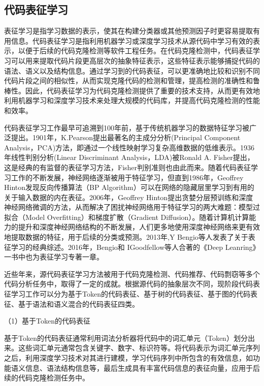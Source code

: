 \subsection{代码表征学习}
表征学习是指学习数据的表示，使其在构建分类器或其他预测因子时更容易提取有用信息\cite{Bengio2013Representation}。代码表征学习是指利用机器学习或深度学习技术从源代码中学习有效的表示，以便于后续的代码克隆检测等软件工程任务。在代码克隆检测中，代码表征学习可以用来提取代码片段更高层次的抽象特征表示，这些特征表示能够捕捉代码的语法、语义以及结构信息。通过学习到的代码表征，可以更准确地比较和识别不同代码片段之间的相似性，从而实现克隆代码的检测和管理，提高检测的准确性和鲁棒性。因此，代码表征学习为代码克隆检测提供了重要的技术支持，从而更有效地利用机器学习和深度学习技术来处理大规模的代码库，并提高代码克隆检测的性能和效率。

代码表征学习工作最早可追溯到100年前，基于传统机器学习的数据特征学习被广泛提出。1901年，K.Pearson提出最著名的主成分分析(Principal Component Analysis，PCA)方法\cite{WOS:000202849800065}，即通过一个线性映射学习复杂高维数据的低维表示。1936年线性判别分析(Linear Discriminant Analysis，LDA)被Ronald A. Fisher提出\cite{2012THE}，这是经典的有监督的表征学习方法，Fisher判别准则也由此而来。随着代码表征学习工作的不断发展，神经网络逐渐被用于特征学习，但直到1986年，Geoffrey Hinton\cite{1986Learning}发现反向传播算法（BP Algorithm）可以在网络的隐藏层里学习到有用的关于输入数据的内在表征。2006年，Geoffrey Hinton提出贪婪分层预训练和深度神经网络微调\cite{2006A}的方法，从而解决了困扰神经网络用于特征学习的两大难题：模型过拟合（Model Overfitting）和梯度扩散（Gradient Diffusion）。随着计算机计算能力的提升和深度神经网络结构的不断发展，人们更多地使用深度神经网络来更有效地提取数据的特征，用于后续的分类或预测。2013年,Y Bengio等人发表了关于表征学习的经典综述\cite{Bengio2013Representation}。2016年，Bengio和 IGoodfellow等人合著的《Deep Leanring》一书中也为表征学习专著一章\cite{goodfellow2016deep}。

近些年来，源代码表征学习方法被用于代码克隆检测、代码推荐、代码剽窃等多个代码分析任务中，取得了一定的成就。根据源代码的抽象层次不同，现阶段代码表征学习工作可以分为基于Token的代码表征、基于树的代码表征、基于图的代码表征、基于语法和语义混合的代码表征四类。

（1）基于Token的代码表征

基于Token的代码表征通常利用词法分析器将代码中的词汇单元（Token）划分出来。这些词汇单元通常包含关键字、数字、标识符等。将代码表示为词汇单元序列之后，利用深度学习技术对其进行建模，学习代码序列中所包含的有效信息，如功能语义信息、语法结构信息等，最后生成具有丰富代码信息的表征向量，应用于后续的代码克隆检测任务中。

